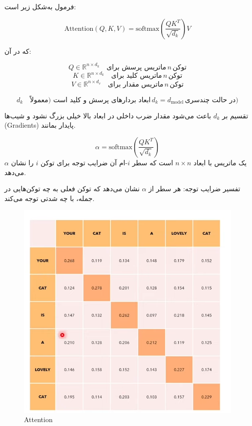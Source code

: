 فرمول به‌شکل زیر است:

\[
\text{Attention}(Q, K, V) = \text{softmax}\left( \frac{QK^T}{\sqrt{d_k}} \right) V
\]

که در آن:

\[
Q \in \mathbb{R}^{n \times d_k} \quad \text{ماتریس پرسش برای} \, n \, \text{توکن}
\]
\[
K \in \mathbb{R}^{n \times d_k} \quad \text{ماتریس کلید برای} \, n \, \text{توکن}
\]
\[
V \in \mathbb{R}^{n \times d_v} \quad \text{ماتریس مقدار برای} \, n \, \text{توکن}
\]

\[
d_k \quad \text{ابعاد بردارهای پرسش و کلید است (معمولاً} \, d_k = d_{\text{model}} \, \text{در حالت چندسری)}
\]

تقسیم بر \( d_k \) باعث می‌شود مقدار ضرب داخلی در ابعاد بالا خیلی بزرگ نشود و شیب‌ها (Gradients) پایدار بمانند.

\[
\alpha = \text{softmax}\left( \frac{QK^T}{\sqrt{d_k}} \right)
\]
\(\alpha\) یک ماتریس با ابعاد \( n \times n \) است که سطر \( i \)-ام آن ضرایب توجه برای توکن \( i \) را نشان می‌دهد.

تفسیر ضرایب توجه: هر سطر از \( \alpha \) نشان می‌دهد که توکن فعلی به چه توکن‌هایی در جمله، با چه شدتی توجه می‌کند.



\begin{figure}[h]
	\centering
	\begin{minipage}[b]{0.7\textwidth}
		\centering
		\includegraphics[width=\textwidth]{transformer_images/attention.png}
		\caption{Attention}
		\label{fig:attention}
	\end{minipage}
	\hfill
	
\end{figure}





